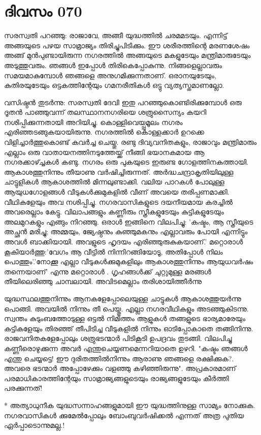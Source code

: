  
\section{ദിവസം 070}


സരസ്വതി പറഞ്ഞു: രാജാവേ, അങ്ങീ യുദ്ധത്തില്‍ ചരമമടയും. എന്നിട്ട്‌ അങ്ങയുടെ പഴയ സാമ്രാജ്യം തിരിച്ചുപിടിക്കും. ഈ ശരീരത്തിന്റെ മരണശേഷം അങ്ങ്‌ മുന്‍പുണ്ടായിരുന്ന നഗരത്തില്‍ അങ്ങയുടെ മകളുടേയും മന്ത്രിമാരുടേയും അടുത്തുവരും. ഞങ്ങള്‍ ഇപ്പോള്‍ തിരികെപ്പോകുന്നു. നിങ്ങളെല്ലാവരും സമയമാകുമ്പോള്‍ ഞങ്ങളെ അനുഗമിക്കുന്നതാണ്‌. ഒരാനയുടേയും, കുതിരയുടേയും ഒട്ടകത്തിന്റേയും ഗമനരീതികള്‍ ഒട്ടു വ്യത്യസ്തമാണല്ലോ.

വസിഷ്ഠന്‍ തുടര്‍ന്നു: സരസ്വതി ദേവി ഇതു പറഞ്ഞുകൊണ്ടിരിക്കുമ്പോള്‍ ഒരു ദൂതന്‍ പാഞ്ഞുവന്ന് തലസ്ഥാനനഗരിയെ ശത്രുസൈന്യം കയറി നശിപ്പിക്കുന്നതായി അറിയിച്ചു. കൊള്ളിവെയ്പ്പുമൂലം നഗരം എരിഞ്ഞടങ്ങുകയായിരുന്നു. നഗരത്തില്‍ കൊള്ളക്കാര്‍ ഉറക്കെ വിളിച്ചാര്‍ത്തുകൊണ്ട്‌ കവര്‍ച്ച ചെയ്തു. രണ്ടു ദിവ്യവനിതകളും, രാജാവും മന്ത്രിമാരും എല്ലാം ഒരു വാതായനത്തിനടുത്തേയ്ക്ക്‌ നീങ്ങി ഭയാനകമായ ആ നഗരക്കാഴ്ച്ചകള്‍ കണ്ടു. നഗരം ഒരു പുകയുടെ ഇരുണ്ട ഗോളത്തിനകത്തായി. ആകാശത്തുനിന്നും തീയാണു വര്‍ഷിച്ചിരുന്നത്‌. അര്‍ദ്ധചന്ദ്രാകൃതിയിലുള്ള ചാട്ടുളികള്‍ ആകാശത്തില്‍ മിന്നലുണ്ടാക്കി. വലിയ പാറകള്‍ പോലുള്ള ആയുധഗോളങ്ങള്‍ വീടുകള്‍ക്കുമുകളില്‍ വീണ്‌ അവയെ തരിപ്പണമാക്കി. വീഥികളേയും അവ നശിപ്പിച്ചു. നഗരവാസികളുടെ ദയനീയമായ കരച്ചില്‍ അവരെല്ലാം കേട്ടു. വിലാപങ്ങളും കണ്ണീരും സ്ത്രീകളുടേയും കുട്ടികളുടേയും അലമുറകളും എങ്ങും നിറഞ്ഞു. ഒരാള്‍ ഇങ്ങിനെ വിലപിച്ചു: 'കഷ്ടം, ആ സ്ത്രീയുടെ അച്ഛന്‍ മരിച്ചു; അമ്മയും, ജ്യേഷ്ഠനും കുഞ്ഞുമകനും എല്ലാവരും പോയി എന്നിട്ടും അവള്‍ ബാക്കിയായി. അവളുടെ ഹൃദയം എരിഞ്ഞുരുകുകയാണ്‌.' മറ്റൊരാള്‍ കൂകിയാര്‍ത്തു:'വേഗം ആ വീട്ടില്‍ നിന്നിറങ്ങിയോടൂ, അതിപ്പോള്‍ നിലം പൊത്തും'.'നോക്കൂ എല്ലാ വീടുകള്‍ക്കുമുകളിലും ആകാശത്തുനിന്നും ആയുധവര്‍ഷം തന്നെയാണ്‌' എന്നു മറ്റൊരാള്‍ . ഗൃഹങ്ങള്‍ക്ക്‌ ചുറ്റുമുള്ള മരങ്ങള്‍ തീയിലെരിഞ്ഞു ചാമ്പലായി. അവിടമെല്ലാം തരിശായിത്തീര്‍ന്നു

യുദ്ധസ്ഥലത്തുനിന്നും ആനകളേപ്പോലെയുള്ള ചാട്ടുകള്‍ ആകാശത്തുയര്‍ന്നു പൊങ്ങി. അവയില്‍ നിന്നും തീ പെയ്തു. എല്ലാ നഗരവീഥികളും അടഞ്ഞുകിടന്നു. സ്വന്തം കുടുംബത്തോടുള്ള ഒട്ടല്‍ നിമിത്തം ആളുകള്‍ തങ്ങളുടെ ഭാര്യമാരേയും കുട്ടികളേയും തിരഞ്ഞ്‌ തീപിടിച്ച വീടുകളില്‍ നിന്നും ഓടിപ്പോകാതെ തങ്ങിനിന്നു. രാജവനിതകളേപ്പോലും ശത്രുഭടന്മാര്‍ പിടികൂടി ഉപദ്രവം തുടങ്ങി. വിലപിച്ചു കണ്ണീരൊഴുക്കുന്ന അവര്‍ എന്തുചെയ്യണമെന്നറിയാതെ ഉഴറി. "കഷ്ടം ഞങ്ങള്‍ എന്തു ചെയ്യട്ടെ! ഈ ദുരിതത്തില്‍നിന്നും ആരാണു ഞങ്ങളെ രക്ഷിക്കുക?. അവരെ ഭടന്മാര്‍ അപ്പോഴേക്കും വളഞ്ഞു കഴിഞ്ഞിരുന്നു". അപ്രകാരമാണ്‌ പരമാധികാരത്തിന്റേയും സാമ്രാജ്യങ്ങളുടെയും രാജ്യങ്ങളുടേയും കീര്‍ത്തി പരക്കുന്നത്‌!

* അത്യാധുനീക യുദ്ധസന്നാഹങ്ങളുമായി ഈ യുദ്ധത്തിനുള്ള സാമ്യം നോക്കുക. നഗരവാസികള്‍ ക്കുമേല്‍പ്പോലും ബോംബുവര്‍ഷിക്കല്‍ എന്നത്‌ അത്ര പുതിയ ഏര്‍പ്പാടൊന്നുമല്ല.!

